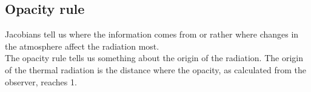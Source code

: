 \subsection*{Opacity rule}
Jacobians tell us where the information comes from or rather where changes in
the atmosphere affect the radiation most.\\
The opacity rule tells us something about the origin of the radiation. The
origin of the thermal radiation is the distance where the opacity, as calculated
from the observer, reaches 1.

%



